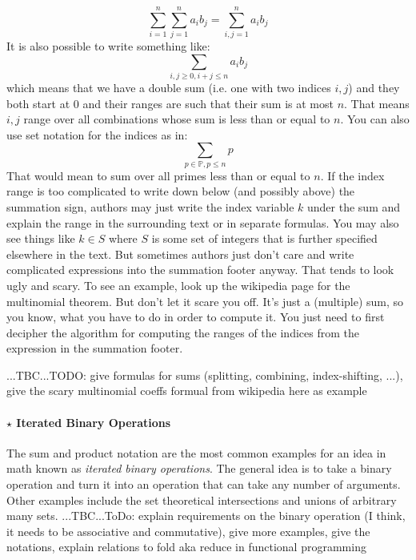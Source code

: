 \begin{equation}
 \sum_{i=1}^{n} \sum_{j=1}^n  a_i b_j = \sum_{i,j=1}^{n} a_i b_j
\end{equation}
It is also possible to write something like:
\begin{equation}
 \sum_{i,j \geq 0, i+j \leq n} a_i b_j
\end{equation}
which means that we have a double sum (i.e. one with two indices $i,j$) and they both start at $0$ and their ranges are such that their sum is at most $n$. That means $i,j$ range over all combinations whose sum is less than or equal to $n$. You can also use set notation for the indices as in:
\begin{equation}
 \sum_{p \in \mathbb{P}, p \leq n} p
\end{equation}
That would mean to sum over all primes less than or equal to $n$. If the index range is too complicated to write down below (and possibly above) the summation sign, authors may just write the index variable $k$ under the sum and explain the range in the surrounding text or in separate formulas. You may also see things like $k \in S$ where $S$ is some set of integers that is further specified elsewhere in the text. But sometimes authors just don't care and write complicated expressions into the summation footer anyway. That tends to look ugly and scary. To see an example, look up the wikipedia page for the multinomial theorem. But don't let it scare you off. It's just a (multiple) sum, so you know, what you have to do in order to compute it. You just need to first decipher the algorithm for computing the ranges of the indices from the expression in the summation footer. 

...TBC...TODO: give formulas for sums (splitting, combining, index-shifting, ...), give the scary multinomial coeffs formual from wikipedia here as example



\paragraph{$\star$ Iterated Binary Operations}
The sum and product notation are the most common examples for an idea in math known as \emph{iterated binary operations}. The general idea is to take a binary operation and turn it into an operation that can take any number of arguments. Other examples include the set theoretical intersections and unions of arbitrary many sets. ...TBC...ToDo: explain requirements on the binary operation (I think, it needs to be associative and commutative), give more examples, give the notations, explain relations to fold aka reduce in functional programming

